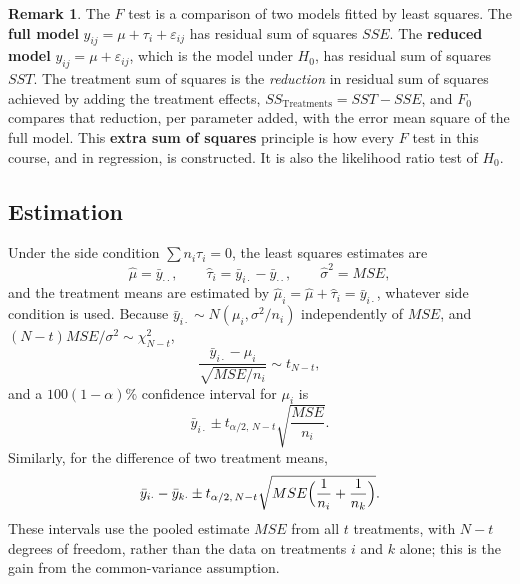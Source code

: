 \documentclass[11pt,a4paper]{article}
\numberwithin{equation}{section}
\theoremstyle{definition}
\newtheorem*{remark}{Remark}
\begin{document}
\begin{remark}
The $F$ test is a comparison of two models fitted by least squares. The \textbf{full model} $y_{ij} = \mu + \tau_i + \varepsilon_{ij}$ has residual sum of squares $SSE$.
The \textbf{reduced model} $y_{ij} = \mu + \varepsilon_{ij}$, which is the model under $H_0$, has residual sum of squares $SST$. The treatment sum of squares is the
\emph{reduction} in residual sum of squares achieved by adding the treatment effects, $SS_{\mathrm{Treatments}} = SST - SSE$, and $F_0$ compares that reduction, per
parameter added, with the error mean square of the full model. This \textbf{extra sum of squares} principle is how every $F$ test in this course, and
in regression, is constructed. It is also the likelihood ratio test of $H_0$.
\end{remark}

\subsection{Estimation}
Under the side condition $\sum n_i\tau_i = 0$, the least squares estimates are
\[
\hat\mu = \bar y_{\cdot\cdot} , \qquad \hat\tau_i = \bar y_{i\cdot} - \bar y_{\cdot\cdot} , \qquad \hat\sigma^2 = MSE ,
\]
and the treatment means are estimated by $\hat\mu_i = \hat\mu + \hat\tau_i = \bar y_{i\cdot}$, whatever side condition is used. Because $\bar y_{i\cdot} \sim N(\mu_i, \sigma^2/n_i)$ independently of
$MSE$, and $(N - t)MSE/\sigma^2 \sim \chi^2_{N-t}$,
\[
\frac{\bar y_{i\cdot} - \mu_i}{\sqrt{MSE/n_i}} \sim t_{N-t} ,
\]
and a $100(1 - \alpha)\%$ confidence interval for $\mu_i$ is
\[
\bar y_{i\cdot} \pm t_{\alpha/2,\,N-t}\sqrt{\frac{MSE}{n_i}} .
\]
Similarly, for the difference of two treatment means,
\[
\bar y_{i\cdot} - \bar y_{k\cdot} \pm t_{\alpha/2,\,N-t}\sqrt{MSE\Bigl(\frac{1}{n_i} + \frac{1}{n_k}\Bigr)} .
\]
These intervals use the pooled estimate $MSE$ from all $t$ treatments, with $N - t$ degrees of freedom, rather than the data on treatments $i$ and $k$
alone; this is the gain from the common-variance assumption.
\end{document}

